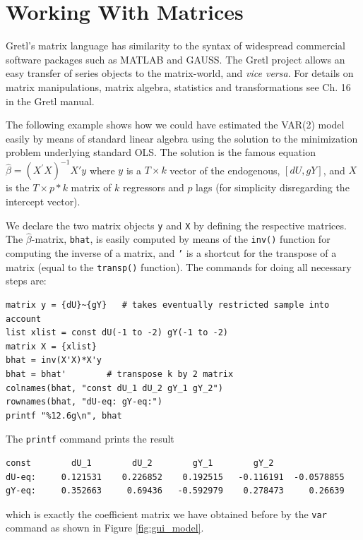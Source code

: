 \documentclass[11pt]{article}
\begin{document}
\section{Working With Matrices}
Gretl's matrix language has similarity to the syntax of widespread commercial software packages such as MATLAB and GAUSS. The Gretl project allows an easy transfer of series objects to the matrix-world, and \textit{vice versa}. For details on matrix manipulations, matrix algebra, statistics and transformations see Ch. 16 in the Gretl manual.

The following example shows how we could have estimated the VAR(2) model easily by means of standard linear algebra using the solution to the minimization problem underlying standard OLS. The solution is the famous equation $ \hat \beta = (X^\prime X)^{-1} X'y $ where $ y $  is a $ T \times k $ vector of the endogenous, $ [dU, gY] $, and $ X $ is the $ T \times p*k $ matrix of $ k $ regressors and $ p $ lags (for simplicity disregarding the intercept vector).

We declare the two matrix objects \texttt{y} and \texttt{X} by defining the respective matrices. The $ \hat \beta $-matrix, \texttt{bhat}, is easily computed by means of the \texttt{inv()} function for computing the inverse of a matrix, and \texttt{'} is a shortcut for the transpose of a matrix (equal to the \texttt{transp()} function). The commands for doing all necessary steps are:
\begin{Verbatim}[baselinestretch=0.75, fontsize=\small]
matrix y = {dU}~{gY}   # takes eventually restricted sample into account
list xlist = const dU(-1 to -2) gY(-1 to -2)
matrix X = {xlist}
bhat = inv(X'X)*X'y
bhat = bhat'		# transpose k by 2 matrix
colnames(bhat, "const dU_1 dU_2 gY_1 gY_2")
rownames(bhat, "dU-eq: gY-eq:")
printf "%12.6g\n", bhat
\end{Verbatim}
The \texttt{printf} command prints the result
\begin{Verbatim}[baselinestretch=0.75, fontsize=\small]
              const        dU_1        dU_2        gY_1        gY_2
dU-eq:     0.121531    0.226852    0.192515   -0.116191  -0.0578855
gY-eq:     0.352663     0.69436   -0.592979    0.278473     0.26639
\end{Verbatim}
which is exactly the coefficient matrix we have obtained before by the \texttt{var} command as shown in Figure \ref{fig:gui_model}.
\end{document}
